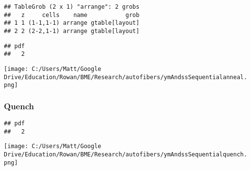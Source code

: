 \documentclass[]{article}
\begin{document}
\begin{verbatim}
## TableGrob (2 x 1) "arrange": 2 grobs
##   z     cells    name           grob
## 1 1 (1-1,1-1) arrange gtable[layout]
## 2 2 (2-2,1-1) arrange gtable[layout]
\end{verbatim}

\begin{verbatim}
## pdf 
##   2
\end{verbatim}

\texttt{[image: C:/Users/Matt/Google Drive/Education/Rowan/BME/Research/autofibers/ymAndssSequentialanneal.png]}

\hypertarget{quench}{%
\subsubsection{Quench}\label{quench}}

\begin{verbatim}
## pdf 
##   2
\end{verbatim}

\texttt{[image: C:/Users/Matt/Google Drive/Education/Rowan/BME/Research/autofibers/ymAndssSequentialquench.png]}
\end{document}
